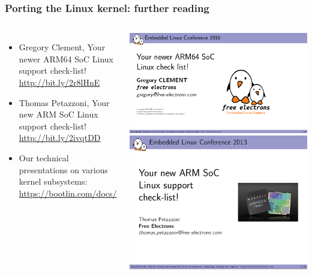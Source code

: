 \begin{frame}
  \frametitle{Porting the Linux kernel: further reading}
  \begin{columns}
    \begin{itemize}
    \item Gregory Clement, Your newer ARM64 SoC Linux support check-list!\\
          \url{http://bit.ly/2r8lHnE}
    \item Thomas Petazzoni, Your new ARM SoC Linux support check-list!\\
          \url{http://bit.ly/2ivqtDD}
    \item Our technical presentations on various kernel subsystems:\\
          \url{https://bootlin.com/docs/}
    \end{itemize}
    \includegraphics[height=0.35\textheight]{slides/kernel-porting-content/arm64-soc-support-checklist.png}\\
    \includegraphics[height=0.35\textheight]{slides/kernel-porting-content/arm-soc-support-checklist.png}
  \end{columns}
\end{frame}
